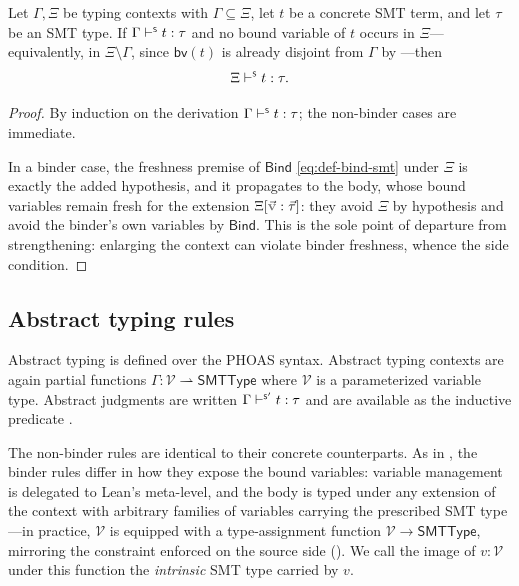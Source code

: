 \begin{theorem}
  \label{thm:smt-weakening}
  Let \(\Gamma, \Xi\) be typing contexts with
  \(\Gamma \subseteq \Xi\), let \(t\) be a concrete SMT term, and let
  \(\tau\) be an SMT type. If \(\Gamma \vdash^{\scriptscriptstyle{\mathsf{S}}} t : \tau\) and no bound variable of
  \(t\) occurs in \(\Xi\)---equivalently, in \(\Xi \setminus \Gamma\), since
  \(\mathsf{bv}(t)\) is already disjoint from \(\Gamma\) by
  ---then
  \[
    \Xi \vdash^{\scriptscriptstyle{\mathsf{S}}} t : \tau.
  \]
\end{theorem}
\begin{proof}
  By induction on the derivation \(\Gamma \vdash^{\scriptscriptstyle{\mathsf{S}}} t : \tau\); the non-binder cases are
  immediate.
  
  In a binder case, the freshness premise of \(\mathsf{Bind}\) \eqref{eq:def-bind-smt} under \(\Xi\)
  is exactly the added hypothesis, and it propagates to the body, whose bound variables
  remain fresh for the extension \(\Xi[\vec{\var{v}}:\vec\tau]\): they avoid \(\Xi\) by
  hypothesis and avoid the binder's own variables by \(\mathsf{Bind}\). This is the sole
  point of departure from strengthening: enlarging the context can violate binder
  freshness, whence the side condition.
\end{proof}

\subsection{Abstract typing rules}
\label{subsec:smt-abstract-typing}

Abstract typing is defined over the PHOAS syntax. Abstract typing contexts are again
partial functions \(\Gamma : \mathcal{V} \rightharpoonup \mathsf{SMTType}\) where
\(\mathcal{V}\) is a parameterized variable type.
Abstract judgments are written \(\Gamma \vdash^{\scriptscriptstyle{\mathsf{S'}}} t : \tau\) and are available as the
inductive predicate {\small{}}.

The non-binder rules are identical to their concrete counterparts. As in
, the binder rules differ in how they expose the
bound variables: variable management is delegated to Lean's meta-level, and the
body is typed under any extension of the context with arbitrary families of
variables carrying the prescribed SMT type---in practice, \(\mathcal{V}\) is equipped
with a type-assignment function \(\mathcal{V} \to \mathsf{SMTType}\), mirroring the constraint
enforced on the source side (). We call the image of
\(v : \mathcal{V}\) under this function the \emph{intrinsic} SMT type carried by \(v\).

